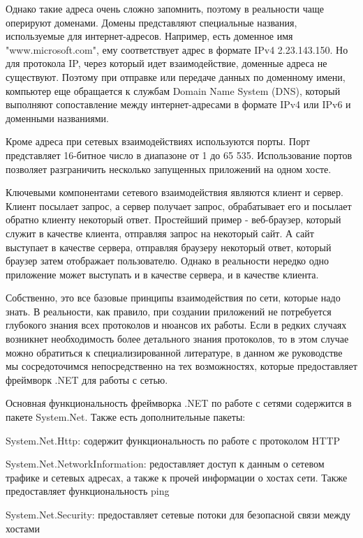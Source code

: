 \documentclass[a4paper, 12pt]{report}
\begin{document}
	Однако такие адреса очень сложно запомнить, поэтому в реальности чаще оперируют доменами. Домены представляют специальные названия, используемые для интернет-адресов. Например, есть доменное имя "www.microsoft.com", ему соответствует адрес в формате IPv4 2.23.143.150. Но для протокола IP, через который идет взаимодействие, доменные адреса не существуют. Поэтому при отправке или передаче данных по доменному имени, компьютер еще обращается к службам Domain Name System (DNS), который выполняют сопоставление между интернет-адресами в формате IPv4 или IPv6 и доменными названиями.
	
	Кроме адреса при сетевых взаимодействиях используются порты. Порт представляет 16-битное число в диапазоне от 1 до 65 535. Использование портов позволяет разграничить несколько запущенных приложений на одном хосте.
	
	Ключевыми компонентами сетевого взаимодействия являются клиент и сервер. Клиент посылает запрос, а сервер получает запрос, обрабатывает его и посылает обратно клиенту некоторый ответ. Простейший пример - веб-браузер, который служит в качестве клиента, отправляя запрос на некоторый сайт. А сайт выступает в качестве сервера, отправляя браузеру некоторый ответ, который браузер затем отображает пользователю. Однако в реальности нередко одно приложение может выступать и в качестве сервера, и в качестве клиента.
	
	Собственно, это все базовые принципы взаимодействия по сети, которые надо знать. В реальности, как правило, при создании приложений не потребуется глубокого знания всех протоколов и нюансов их работы. Если в редких случаях возникнет необходимость более детального знания протоколов, то в этом случае можно обратиться к специализированной литературе, в данном же руководстве мы сосредоточимся непосредственно на тех возможностях, которые предоставляет фреймворк .NET для работы с сетью.
	
	Основная функциональность фреймворка .NET по работе с сетями содержится в пакете System.Net. Также есть дополнительные пакеты:
	
	System.Net.Http: содержит функциональность по работе с протоколом HTTP
	
	System.Net.NetworkInformation: редоставляет доступ к данным о сетевом трафике и сетевых адресах, а также к прочей информации о хостах сети. Также предоставляет функциональность ping
	
	System.Net.Security: предоставляет сетевые потоки для безопасной связи между хостами
	
\end{document}
